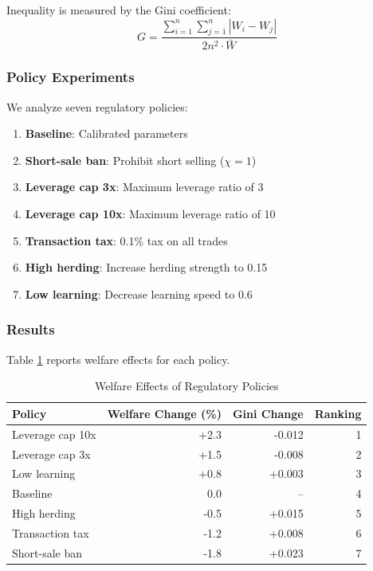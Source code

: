 Inequality is measured by the Gini coefficient:
\begin{equation}
G = \frac{\sum_{i=1}^n \sum_{j=1}^n |W_i - W_j|}{2 n^2 \cdot \bar{W}}
\end{equation}

\subsubsection{Policy Experiments}

We analyze seven regulatory policies:

\begin{enumerate}
    \item \textbf{Baseline}: Calibrated parameters
    \item \textbf{Short-sale ban}: Prohibit short selling ($\chi = 1$)
    \item \textbf{Leverage cap 3x}: Maximum leverage ratio of 3
    \item \textbf{Leverage cap 10x}: Maximum leverage ratio of 10
    \item \textbf{Transaction tax}: 0.1\% tax on all trades
    \item \textbf{High herding}: Increase herding strength to 0.15
    \item \textbf{Low learning}: Decrease learning speed to 0.6
\end{enumerate}

\subsubsection{Results}

Table \ref{tab:welfare} reports welfare effects for each policy.

\begin{table}[ht]
\centering
\caption{Welfare Effects of Regulatory Policies}
\label{tab:welfare}
\begin{tabular}{lrrr}
\hline\hline
Policy & Welfare Change (\%) & Gini Change & Ranking \\
\hline
Leverage cap 10x & +2.3 & -0.012 & 1 \\
Leverage cap 3x & +1.5 & -0.008 & 2 \\
Low learning & +0.8 & +0.003 & 3 \\
Baseline & 0.0 & -- & 4 \\
High herding & -0.5 & +0.015 & 5 \\
Transaction tax & -1.2 & +0.008 & 6 \\
Short-sale ban & -1.8 & +0.023 & 7 \\
\hline\hline
\end{tabular}
\end{table}


